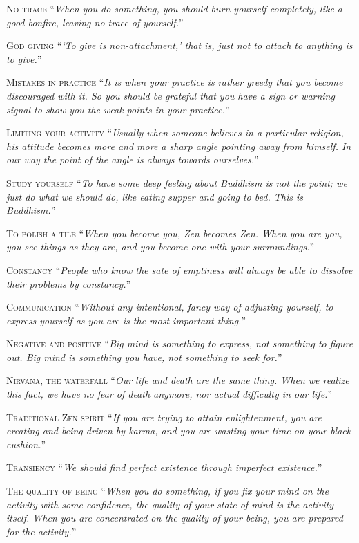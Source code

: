 \documentclass[14pt]{extarticle}
\newcommand{\aphor}[3]{
    \lettrine[lines=2, lraise=0.15]{#1}{#2}
    \enquote{\textit{#3}}
}
\begin{document}
\aphor{N}{o trace} {When you do something, you should burn yourself completely, like a good bonfire, leaving no trace of yourself.}

\aphor{G}{od giving} {\enquote{To give is non-attachment,} that is, just not to attach to anything is to give.}

\aphor{M}{istakes in practice} {It is when your practice is rather greedy that you become discouraged with it. So you should be grateful that you have a sign or warning signal to show you the weak points in your practice.}

\aphor{L}{imiting your activity} {Usually when someone believes in a particular religion, his attitude becomes more and more a sharp angle pointing away from himself. In our way the point of the angle is always towards ourselves.}

\pagebreak

\aphor{S}{tudy yourself} {To have some deep feeling about Buddhism is not the point; we just do what we should do, like eating supper and going to bed. This is Buddhism.}


\aphor{T}{o polish a tile} {When you become you, Zen becomes Zen. When you are you, you see things as they are, and you become one with your surroundings.}

\aphor{C}{onstancy} {People who know the sate of emptiness will always be able to dissolve their problems by constancy.}

\aphor{C}{ommunication} {Without any intentional, fancy way of adjusting yourself, to express yourself as you are is the most important thing.}

\aphor{N}{egative and positive} {Big mind is something to express, not something to figure out. Big mind is something you have, not something to seek for.}

\aphor{N}{irvana, the waterfall} {Our life and death are the same thing. When we realize this fact, we have no fear of death anymore, nor actual difficulty in our life.}

\aphor{T}{raditional Zen spirit} {If you are trying to attain enlightenment, you are creating and being driven by karma, and you are wasting your time on your black cushion.}

\aphor{T}{ransiency} {We should find perfect existence through imperfect existence.}

\aphor{T}{he quality of being} {When you do something, if you fix your mind on the activity with some confidence, the quality of your state of mind is the activity itself. When you are concentrated on the quality of your being, you are prepared for the activity.}
\end{document}
